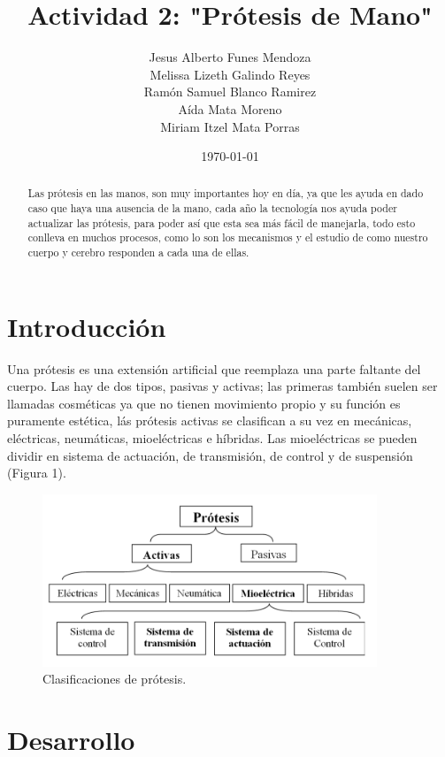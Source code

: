 \documentclass{article}
\author{Jesus Alberto Funes Mendoza  \\
Melissa Lizeth Galindo Reyes  \\
Ramón Samuel Blanco Ramirez  \\
Aída Mata Moreno  \\
Miriam Itzel Mata Porras  \\ } %
\title{Actividad 2: "Prótesis de Mano"} %
\date{\today}
\begin{document}

\maketitle %

\begin{abstract} %
Las prótesis en las manos, son muy importantes hoy en día, ya que les ayuda en dado caso que haya una ausencia de la mano, cada año la tecnología nos ayuda poder actualizar las prótesis, para poder así que esta sea más fácil de manejarla, todo esto conlleva en muchos procesos, como lo son los mecanismos y el estudio de como nuestro cuerpo y cerebro responden a cada una de ellas. 
\end{abstract}

\section{Introducción}\label{intro} %

 
Una prótesis es una extensión artificial que reemplaza una parte faltante del cuerpo. Las hay de dos tipos, pasivas y activas; las primeras también suelen ser llamadas cosméticas ya que no tienen movimiento propio y su función es puramente estética, lás prótesis activas se clasifican a su vez en mecánicas, eléctricas, neumáticas, mioeléctricas e híbridas. Las mioeléctricas se pueden dividir en sistema de actuación, de transmisión, de control y de suspensión (Figura 1)\cite{ff2}. 

\begin{figure}[H] %
    \centering
    \includegraphics[width=100mm]{Clasificaciones.png} %
    \caption{Clasificaciones de prótesis\cite{ff2}.}
    \label{grafica}
\end{figure}


\section{Desarrollo}
\end{document}
